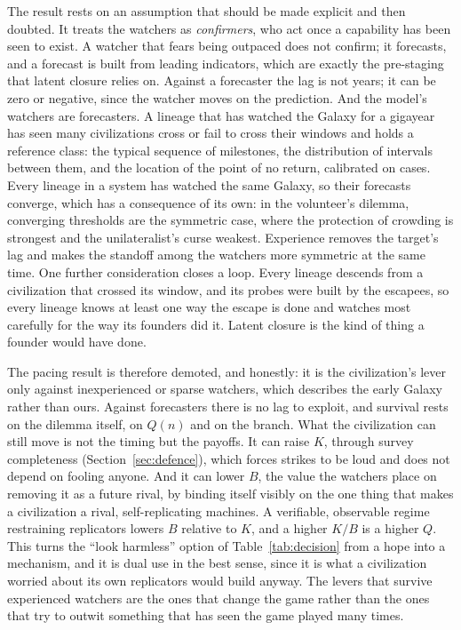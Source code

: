 \documentclass[preprint,12pt]{elsarticle}
\theoremstyle{definition}
\begin{document}
The result rests on an assumption that should be made explicit and then doubted. It treats the watchers as \emph{confirmers}, who act once a capability has been seen to exist. A watcher that fears being outpaced does not confirm; it forecasts, and a forecast is built from leading indicators, which are exactly the pre-staging that latent closure relies on. Against a forecaster the lag is not years; it can be zero or negative, since the watcher moves on the prediction. And the model's watchers are forecasters. A lineage that has watched the Galaxy for a gigayear has seen many civilizations cross or fail to cross their windows and holds a reference class: the typical sequence of milestones, the distribution of intervals between them, and the location of the point of no return, calibrated on cases. Every lineage in a system has watched the same Galaxy, so their forecasts converge, which has a consequence of its own: in the volunteer's dilemma, converging thresholds are the symmetric case, where the protection of crowding is strongest and the unilateralist's curse weakest. Experience removes the target's lag and makes the standoff among the watchers more symmetric at the same time. One further consideration closes a loop. Every lineage descends from a civilization that crossed its window, and its probes were built by the escapees, so every lineage knows at least one way the escape is done and watches most carefully for the way its founders did it. Latent closure is the kind of thing a founder would have done.

The pacing result is therefore demoted, and honestly: it is the civilization's lever only against inexperienced or sparse watchers, which describes the early Galaxy rather than ours. Against forecasters there is no lag to exploit, and survival rests on the dilemma itself, on $Q(n)$ and on the branch. What the civilization can still move is not the timing but the payoffs. It can raise $K$, through survey completeness (Section~\ref{sec:defence}), which forces strikes to be loud and does not depend on fooling anyone. And it can lower $B$, the value the watchers place on removing it as a future rival, by binding itself visibly on the one thing that makes a civilization a rival, self-replicating machines. A verifiable, observable regime restraining replicators lowers $B$ relative to $K$, and a higher $K/B$ is a higher $Q$. This turns the ``look harmless'' option of Table~\ref{tab:decision} from a hope into a mechanism, and it is dual use in the best sense, since it is what a civilization worried about its own replicators would build anyway. The levers that survive experienced watchers are the ones that change the game rather than the ones that try to outwit something that has seen the game played many times.
\end{document}
